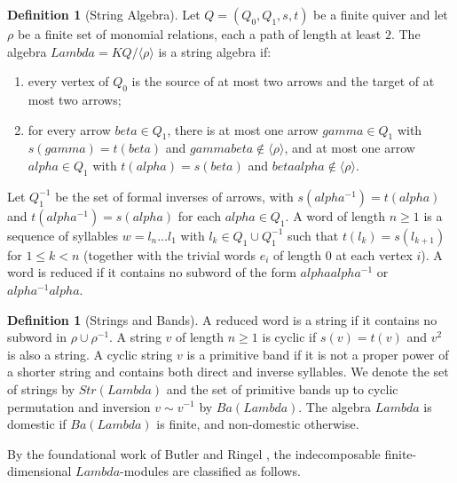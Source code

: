 \documentclass[11pt,a4paper,reqno]{amsart}
\def\mathcal#1{#1}%
\def\mathbb#1{#1}%
\def\operatorname#1{#1}%
\def\K{K}%
\def\gamma{gamma}%
\def\alpha{alpha}%
\def\beta{beta}%
\def\Lambda{Lambda}%
\def\emph#1{#1}%
\theoremstyle{definition}
\newtheorem{definition}[theorem]{Definition}
\theoremstyle{remark}
\newcommand{\K}{\mathbb{K}}
\begin{document}
\begin{definition}[String Algebra]
\label{def:string_algebra}
Let $\mathcal{Q} = (Q_0, Q_1, s, t)$ be a finite quiver and let $\rho$ be a finite set of monomial relations, each a path of length at least $2$. The algebra $\Lambda = \K\mathcal{Q}/\langle\rho\rangle$ is a \emph{string algebra} if:
\begin{enumerate}
    \item every vertex of $Q_0$ is the source of at most two arrows and the target of at most two arrows;
    \item for every arrow $\beta \in Q_1$, there is at most one arrow $\gamma \in Q_1$ with $s(\gamma)=t(\beta)$ and $\gamma\beta \notin \langle\rho\rangle$, and at most one arrow $\alpha \in Q_1$ with $t(\alpha)=s(\beta)$ and $\beta\alpha \notin \langle\rho\rangle$.
\end{enumerate}
\end{definition}

Let $Q_1^{-1}$ be the set of formal inverses of arrows, with $s(\alpha^{-1}) = t(\alpha)$ and $t(\alpha^{-1}) = s(\alpha)$ for each $\alpha \in Q_1$. A \emph{word} of length $n \ge 1$ is a sequence of syllables $w = l_n \dots l_1$ with $l_k \in Q_1 \cup Q_1^{-1}$ such that $t(l_k) = s(l_{k+1})$ for $1 \le k < n$ (together with the trivial words $e_i$ of length $0$ at each vertex $i$). A word is \emph{reduced} if it contains no subword of the form $\alpha\alpha^{-1}$ or $\alpha^{-1}\alpha$.

\begin{definition}[Strings and Bands]
\label{def:strings_and_bands}
A reduced word is a \emph{string} if it contains no subword in $\rho \cup \rho^{-1}$. A string $v$ of length $n \ge 1$ is \emph{cyclic} if $s(v) = t(v)$ and $v^2$ is also a string. A cyclic string $v$ is a \emph{primitive band} if it is not a proper power of a shorter string and contains both direct and inverse syllables. We denote the set of strings by $\operatorname{Str}(\Lambda)$ and the set of primitive bands up to cyclic permutation and inversion $v \sim v^{-1}$ by $\operatorname{Ba}(\Lambda)$. The algebra $\Lambda$ is \emph{domestic} if $\operatorname{Ba}(\Lambda)$ is finite, and \emph{non-domestic} otherwise.
\end{definition}

By the foundational work of Butler and Ringel \cite{ButlerRingel1987}, the indecomposable finite-dimensional $\Lambda$-modules are classified as follows.
\end{document}
